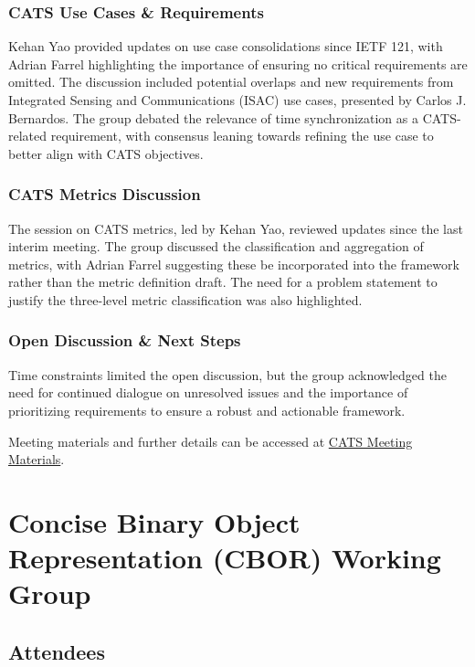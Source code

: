 \documentclass{article}
\begin{document}
\subsubsection{CATS Use Cases \& Requirements}
Kehan Yao provided updates on use case consolidations since IETF 121, with Adrian Farrel highlighting the importance of ensuring no critical requirements are omitted. The discussion included potential overlaps and new requirements from Integrated Sensing and Communications (ISAC) use cases, presented by Carlos J. Bernardos. The group debated the relevance of time synchronization as a CATS-related requirement, with consensus leaning towards refining the use case to better align with CATS objectives.

\subsubsection{CATS Metrics Discussion}
The session on CATS metrics, led by Kehan Yao, reviewed updates since the last interim meeting. The group discussed the classification and aggregation of metrics, with Adrian Farrel suggesting these be incorporated into the framework rather than the metric definition draft. The need for a problem statement to justify the three-level metric classification was also highlighted.

\subsubsection{Open Discussion \& Next Steps}
Time constraints limited the open discussion, but the group acknowledged the need for continued dialogue on unresolved issues and the importance of prioritizing requirements to ensure a robust and actionable framework.

Meeting materials and further details can be accessed at \href{https://datatracker.ietf.org/meeting/122/session/cats}{CATS Meeting Materials}.



\newpage

\section{Concise Binary Object Representation (CBOR) Working Group}

\subsection{Attendees}
\end{document}
